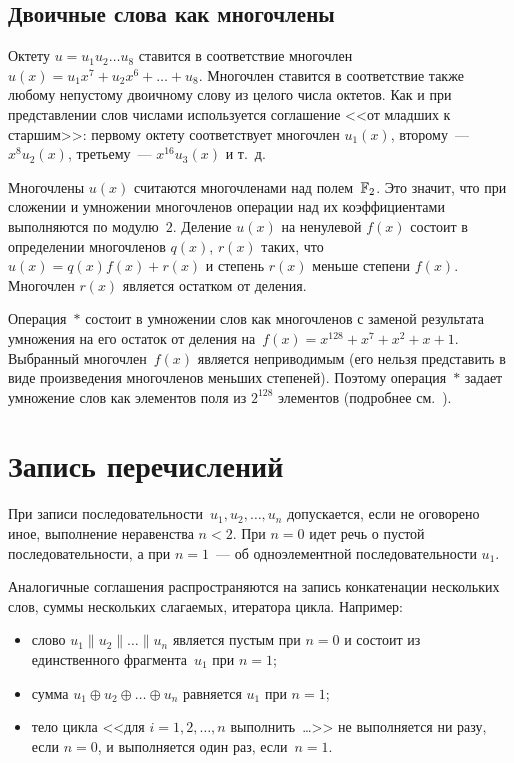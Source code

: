 \subsection{Двоичные слова как многочлены}\label{DEFS.Poly}

Октету $u=u_1 u_2\ldots u_8$ ставится в соответствие многочлен
$u(x)=u_1 x^7+u_2 x^6 +\ldots + u_8$. 
%
Многочлен ставится в соответствие также любому непустому
двоичному слову из целого числа октетов.
Как и при представлении слов числами используется 
соглашение <<от младших к старшим>>:
первому октету соответствует многочлен $u_1(x)$,
второму~--- $x^8 u_2(x)$, третьему~--- $x^{16}u_3(x)$ и т.~д.

Многочлены $u(x)$ считаются многочленами над полем~$\mathbb{F}_2$. 
Это значит, что при сложении и умножении многочленов операции над их
коэффициентами выполняются по модулю~$2$.
%
Деление $u(x)$ на ненулевой $f(x)$ состоит в определении многочленов 
$q(x)$, $r(x)$ таких, что $u(x)=q(x)f(x)+r(x)$ и степень $r(x)$ меньше 
степени $f(x)$. 
Многочлен $r(x)$ является остатком от деления.

Операция~$\ast$ состоит в умножении слов как многочленов с заменой результата
умножения на его остаток от деления на~$f(x)=x^{128}+x^7+x^2+x+1$. 
%
Выбранный многочлен~$f(x)$ является неприводимым (его нельзя представить
в виде произведения многочленов меньших степеней).
Поэтому операция~$\ast$ задает умножение слов как элементов поля из $2^{128}$
элементов (подробнее см.~\cite{LidNid88}).

\section{Запись перечислений}\label{DEFS.Seqs}

При записи последовательности~$u_1,u_2,\ldots,u_n$ 
допускается, если не оговорено иное, выполнение неравенства $n<2$.
При $n=0$ идет речь о пустой последовательности, 
а при $n=1$~--- об одноэлементной последовательности $u_1$.

Аналогичные соглашения распространяются на запись конкатенации нескольких
слов, суммы нескольких слагаемых, итератора цикла.
%
Например:
\begin{itemize}
\item
слово $u_1\parallel u_2\parallel\ldots\parallel u_n$ является пустым при $n=0$ 
и состоит из единственного фрагмента~$u_1$ при $n=1$;
\item
сумма $u_1\oplus u_2\oplus\ldots\oplus u_n$ равняется $u_1$ при $n=1$;
%
\item
тело цикла <<для $i=1,2,\ldots,n$ выполнить~\ldots>>
не выполняется ни разу, если $n=0$, и выполняется один раз, если~$n=1$.
\end{itemize}


